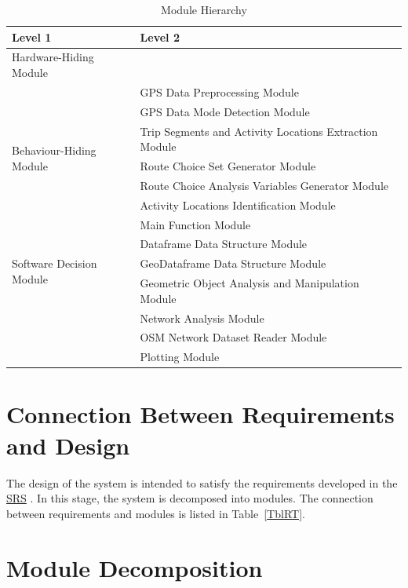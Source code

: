 \documentclass[12pt, titlepage]{article}
\begin{document}
\begin{table}[h!]
\centering
\begin{tabular}{p{} p{}}
\toprule
\textbf{Level 1} & \textbf{Level 2}\\
\midrule

{Hardware-Hiding Module} & ~ \\
\midrule

\multirow{7}{0.3\textwidth}{Behaviour-Hiding Module}
& GPS Data Preprocessing Module\\
& GPS Data Mode Detection Module \\
& Trip Segments and Activity Locations Extraction Module\\
& Route Choice Set Generator Module\\
& Route Choice Analysis Variables Generator Module\\
& Activity Locations Identification Module\\
& Main Function Module\\ 
\midrule

\multirow{3}{0.3\textwidth}{Software Decision Module}
& Dataframe Data Structure Module\\
& GeoDataframe Data Structure Module\\
& Geometric Object Analysis and Manipulation Module\\
& Network Analysis Module\\
& OSM Network Dataset Reader Module\\
& Plotting Module\\
\bottomrule

\end{tabular}
\caption{Module Hierarchy}
\label{TblMH}
\end{table}

\section{Connection Between Requirements and Design} \label{SecConnection}

The design of the system is intended to satisfy the requirements developed in
the \href{https://github.com/paezha/PyERT-BLACK/blob/main/docs/SRS/SRS.pdf}{SRS} \citep{SRS}. In this stage, the system is decomposed into modules. The connection
between requirements and modules is listed in Table~\ref{TblRT}.

\section{Module Decomposition} \label{SecMD}
\end{document}
